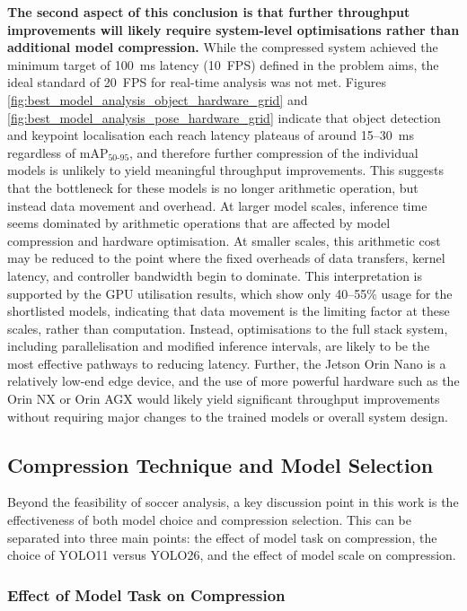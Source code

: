 \textbf{The second aspect of this conclusion is that further throughput improvements will likely require system-level optimisations rather than additional model compression.} While the compressed system achieved the minimum target of 100~ms latency (10~FPS) defined in the problem aims, the ideal standard of 20~FPS for real-time analysis was not met. Figures \ref{fig:best_model_analysis_object_hardware_grid} and \ref{fig:best_model_analysis_pose_hardware_grid} indicate that object detection and keypoint localisation each reach latency plateaus of around 15--30~ms regardless of mAP$_{50\text{-}95}$, and therefore further compression of the individual models is unlikely to yield meaningful throughput improvements. This suggests that the bottleneck for these models is no longer arithmetic operation, but instead data movement and overhead. At larger model scales, inference time seems dominated by arithmetic operations that are affected by model compression and hardware optimisation. At smaller scales, this arithmetic cost may be reduced to the point where the fixed overheads of data transfers, kernel latency, and controller bandwidth begin to dominate. This interpretation is supported by the GPU utilisation results, which show only 40--55\% usage for the shortlisted models, indicating that data movement is the limiting factor at these scales, rather than computation. Instead, optimisations to the full stack system, including parallelisation and modified inference intervals, are likely to be the most effective pathways to reducing latency. Further, the Jetson Orin Nano is a relatively low-end edge device, and the use of more powerful hardware such as the Orin NX or Orin AGX would likely yield significant throughput improvements without requiring major changes to the trained models or overall system design.

\subsection{Compression Technique and Model Selection}

Beyond the feasibility of soccer analysis, a key discussion point in this work is the effectiveness of both model choice and compression selection. This can be separated into three main points: the effect of model task on compression, the choice of YOLO11 versus YOLO26, and the effect of model scale on compression.

\subsubsection{Effect of Model Task on Compression}
\label{task_compression_discussion}

